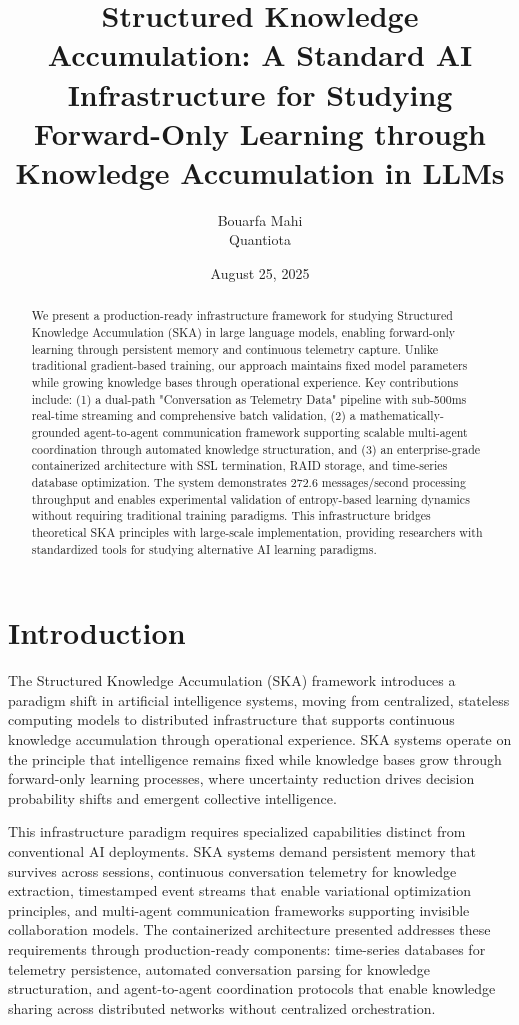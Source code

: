 \documentclass[11pt]{article}
\title{\textbf{Structured Knowledge Accumulation: A Standard AI Infrastructure for Studying Forward-Only Learning through Knowledge Accumulation in LLMs}}
\author{Bouarfa Mahi\\Quantiota}
\date{August 25, 2025}
\begin{document}
	\maketitle
	
	\begin{abstract}
		We present a production-ready infrastructure framework for studying Structured Knowledge Accumulation (SKA) in large language models, enabling forward-only learning through persistent memory and continuous telemetry capture. Unlike traditional gradient-based training, our approach maintains fixed model parameters while growing knowledge bases through operational experience. Key contributions include: (1) a dual-path "Conversation as Telemetry Data" pipeline with sub-500ms real-time streaming and comprehensive batch validation, (2) a mathematically-grounded agent-to-agent communication framework supporting scalable multi-agent coordination through automated knowledge structuration, and (3) an enterprise-grade containerized architecture with SSL termination, RAID storage, and time-series database optimization. The system demonstrates 272.6 messages/second processing throughput and enables experimental validation of entropy-based learning dynamics without requiring traditional training paradigms. This infrastructure bridges theoretical SKA principles with large-scale implementation, providing researchers with standardized tools for studying alternative AI learning paradigms.
	\end{abstract}
	
	\section{Introduction}
	\label{sec:introduction}
	
	The Structured Knowledge Accumulation (SKA) framework introduces a paradigm shift in artificial intelligence systems, moving from centralized, stateless computing models to distributed infrastructure that supports continuous knowledge accumulation through operational experience. SKA systems operate on the principle that intelligence remains fixed while knowledge bases grow through forward-only learning processes, where uncertainty reduction drives decision probability shifts and emergent collective intelligence.
	
	This infrastructure paradigm requires specialized capabilities distinct from conventional AI deployments. SKA systems demand persistent memory that survives across sessions, continuous conversation telemetry for knowledge extraction, timestamped event streams that enable variational optimization principles, and multi-agent communication frameworks supporting invisible collaboration models. The containerized architecture presented addresses these requirements through production-ready components: time-series databases for telemetry persistence, automated conversation parsing for knowledge structuration, and agent-to-agent coordination protocols that enable knowledge sharing across distributed networks without centralized orchestration.
	
\end{document}
